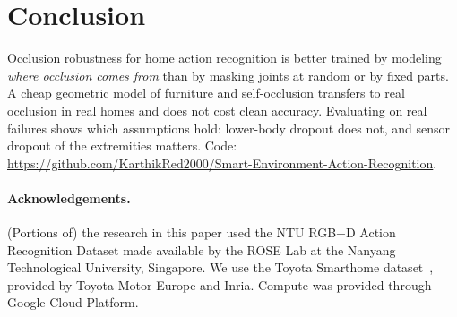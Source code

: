 \documentclass[11pt,twocolumn,letterpaper]{article}
\begin{document}
\section{Conclusion}
Occlusion robustness for home action recognition is better trained by modeling \emph{where occlusion comes from} than by masking joints at random or by fixed parts.
A cheap geometric model of furniture and self-occlusion transfers to real occlusion in real homes and does not cost clean accuracy.
Evaluating on real failures shows which assumptions hold: lower-body dropout does not, and sensor dropout of the extremities matters.
Code: \url{https://github.com/KarthikRed2000/Smart-Environment-Action-Recognition}.

\paragraph{Acknowledgements.}
(Portions of) the research in this paper used the NTU RGB+D Action Recognition Dataset made available by the ROSE Lab at the Nanyang Technological University, Singapore.
We use the Toyota Smarthome dataset~\cite{das2019toyota}, provided by Toyota Motor Europe and Inria.
Compute was provided through Google Cloud Platform.

{\small


}
\end{document}
